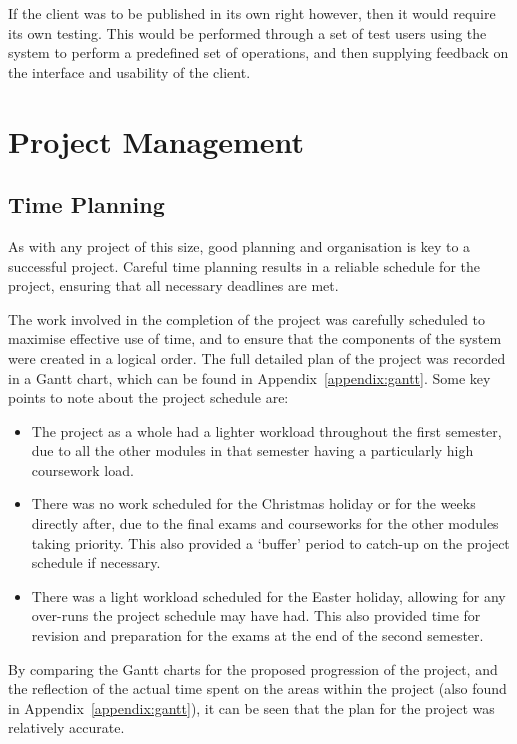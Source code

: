 \documentclass[11pt,a4paper]{report}
\begin{document}
If the client was to be published in its own right however, then it would require its own testing. This would be performed through a set of test users using the system to perform a predefined set of operations, and then supplying feedback on the interface and usability of the client.

\pagebreak

\chapter{Project Management}
\label{chap:projmanagement}

\section{Time Planning}
As with any project of this size, good planning and organisation is key to a successful project. Careful time planning results in a reliable schedule for the project, ensuring that all necessary deadlines are met.

The work involved in the completion of the project was carefully scheduled to maximise effective use of time, and to ensure that the components of the system were created in a logical order. The full detailed plan of the project was recorded in a Gantt chart, which can be found in Appendix~\ref{appendix:gantt}. Some key points to note about the project schedule are:
\begin{itemize}
    \item The project as a whole had a lighter workload throughout the first semester, due to all the other modules in that semester having a particularly high coursework load.
    \item There was no work scheduled for the Christmas holiday or for the weeks directly after, due to the final exams and courseworks for the other modules taking priority. This also provided a `buffer' period to catch-up on the project schedule if necessary.
    \item There was a light workload scheduled for the Easter holiday, allowing for any over-runs the project schedule may have had. This also provided time for revision and preparation for the exams at the end of the second semester.
\end{itemize}

By comparing the Gantt charts for the proposed progression of the project, and the reflection of the actual time spent on the areas within the project (also found in Appendix~\ref{appendix:gantt}), it can be seen that the plan for the project was relatively accurate. 
\end{document}
